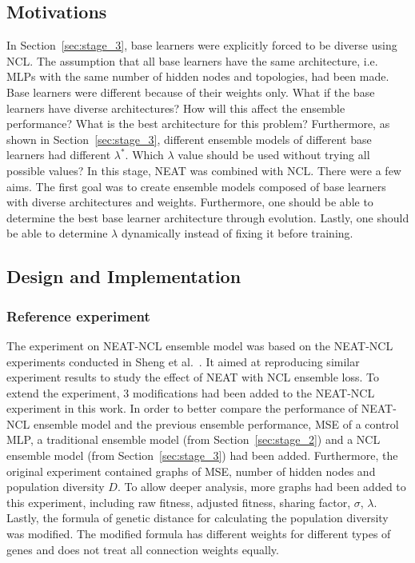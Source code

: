 \documentclass{article}
\begin{document}
\subsection{Motivations}
In Section~\ref{sec:stage_3}, base learners were explicitly forced to be diverse using NCL. The assumption that all base learners have the same architecture, i.e. MLPs with the same number of hidden nodes and topologies, had been made. Base learners were different because of their weights only. What if the base learners have diverse architectures? How will this affect the ensemble performance? What is the best architecture for this problem? Furthermore, as shown in Section~\ref{sec:stage_3}, different ensemble models of different base learners had different $\lambda^*$. Which $\lambda$ value should be used without trying all possible values? In this stage, NEAT was combined with NCL. There were a few aims. The first goal was to create ensemble models composed of base learners with diverse architectures and weights. Furthermore, one should be able to determine the best base learner architecture through evolution. Lastly, one should be able to determine $\lambda$ dynamically instead of fixing it before training. 


\subsection{Design and Implementation}


\subsubsection{Reference experiment}
The experiment on NEAT-NCL ensemble model was based on the NEAT-NCL experiments conducted in Sheng et al.\ \cite{sheng2017niching}. It aimed at reproducing similar experiment results to study the effect of NEAT with NCL ensemble loss. To extend the experiment, 3 modifications had been added to the NEAT-NCL experiment in this work. In order to better compare the performance of NEAT-NCL ensemble model and the previous ensemble performance, MSE of a control MLP, a traditional ensemble model (from Section~\ref{sec:stage_2}) and a NCL ensemble model (from Section~\ref{sec:stage_3}) had been added. Furthermore, the original experiment contained graphs of MSE, number of hidden nodes and population diversity $D$. To allow deeper analysis, more graphs had been added to this experiment, including raw fitness, adjusted fitness, sharing factor, $\sigma$, $\lambda$. Lastly, the formula of genetic distance for calculating the population diversity was modified. The modified formula has different weights for different types of genes and does not treat all connection weights equally. 
\end{document}
